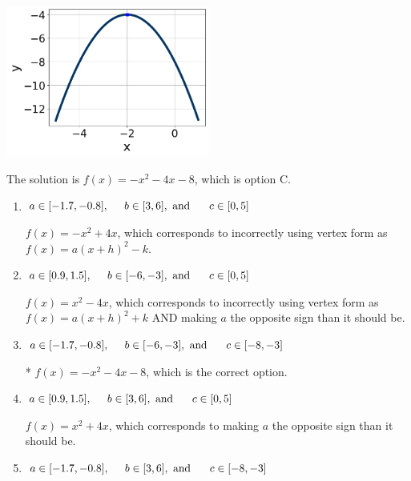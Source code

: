 \documentclass{extbook}[14pt]
\begin{document}
\begin{enumerate}
{\begin{center}
    \includegraphics[width=0.5\textwidth]{../Figures/quadraticGraphToEquationCopyB.png}
\end{center}



The solution is \( f(x) = -x^{2} -4 x -8 \), which is option C.\begin{enumerate}[label=\Alph*.]
\item \( a \in [-1.7, -0.8], \hspace*{5mm} b \in [3, 6], \text{ and } \hspace*{5mm} c \in [0, 5] \)

$f(x)=-x^{2} +4 x$, which corresponds to incorrectly using vertex form as $f(x) = a(x+h)^2 - k$.
\item \( a \in [0.9, 1.5], \hspace*{5mm} b \in [-6, -3], \text{ and } \hspace*{5mm} c \in [0, 5] \)

$f(x)=x^{2} -4 x$, which corresponds to incorrectly using vertex form as $f(x) = a(x+h)^2+k$ AND making $a$ the opposite sign than it should be.
\item \( a \in [-1.7, -0.8], \hspace*{5mm} b \in [-6, -3], \text{ and } \hspace*{5mm} c \in [-8, -3] \)

* $f(x)=-x^{2} -4 x -8$, which is the correct option.
\item \( a \in [0.9, 1.5], \hspace*{5mm} b \in [3, 6], \text{ and } \hspace*{5mm} c \in [0, 5] \)

$f(x)=x^{2} +4 x$, which corresponds to making $a$ the opposite sign than it should be.
\item \( a \in [-1.7, -0.8], \hspace*{5mm} b \in [3, 6], \text{ and } \hspace*{5mm} c \in [-8, -3] \)


\end{enumerate}}
\end{enumerate}
\end{document}
